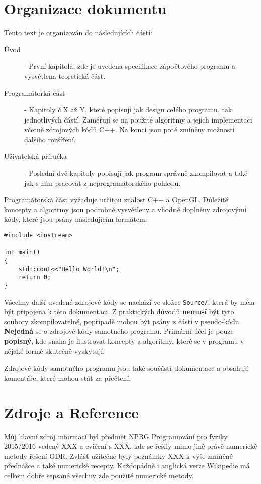 
\chapter*{Organizace dokumentu}
Tento text je organizován do následujících částí:
\begin{description}
	\item[Úvod] - První kapitola, zde je uvedena specifikace zápočtového programu a vysvětlena teoretická část.
	\item[Programátorká část] - Kapitoly č.X až Y, které popisují jak design celého programu, tak jednotlivých částí. Zaměřují se na použité algoritmy a jejich implementaci včetně zdrojových kódů C++. Na konci jsou poté zmíněny možnosti dalšího rozšíření.
	\item[Uživatelská příručka] - Poslední dvě kapitoly popisují jak program správně zkompilovat a také jak s ním pracovat z neprogramátorského pohledu.
	
\end{description}
Programátorská část vyžaduje určitou znalost C++ a OpenGL. Důležité koncepty a algoritmy jsou podrobně vysvětleny a vhodně doplněny zdrojovými kódy, které jsou psány následujícím formátem:
\begin{lstlisting}[title=Text vystihující příklad (Název souboru)]
#include <iostream>

int main()
{
	std::cout<<"Hello World!\n";
	return 0;
}
\end{lstlisting}
Všechny další uvedené zdrojové kódy se nachází ve složce \texttt{Source/}, která
by měla být připojena k této dokumentaci. Z praktických důvodů \textbf{nemusí} být tyto soubory zkompilovatelné, popřípadě mohou být psány z části v pseudo-kódu. \textbf{Nejedná} se o zdrojové kódy samotného programu. Primární účel je pouze \textbf{popisný}, kde snaha je ilustrovat koncepty a algoritmy, které se v programu v nějaké formě skutečně vyskytují.

Zdrojové kódy samotného programu jsou také součástí dokumentace a obsahují komentáře, které mohou stát za přečtení.

\chapter*{Zdroje a Reference}
Můj hlavní zdroj informací byl předmět NPRG Programování pro fyziky 2015/2016 vedený XXX a cvičení s XXX, kde se řešily mimo jiné právě numerické metody řešení ODR. Zvlášť užitečné byly poznámky XXX k výše zmíněné přednášce a také numerické recepty. Každopádně i anglická verze Wikipedie má celkem dobře sepsané všechny zde použité numerické metody.
